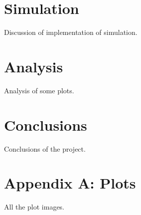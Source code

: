 \documentclass[12pt]{article}
\begin{document}
    \section{Simulation}

    Discussion of implementation of simulation.


    \section{Analysis}

    Analysis of some plots.


    \section{Conclusions}

    Conclusions of the project.


    \section{Appendix A: Plots}

    All the plot images.


    \section{}
\end{document}
